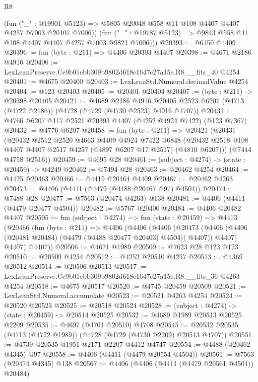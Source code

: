 \begin{lexlean}{R8}
\begin{coremodule}
          (fun ("_" : @19901 @5123) =>
          @5805 @20048 @558 @11 @108 @4407 @4407 @4257 @7003 @20107 @7006))
        (fun ("_" : @19787 @5123) => @9843 @558 @11 @108 @4407 @4407 @4257 @7003 @9821 @7006)))
@20393 := @6150 @4409
@20396 := fun (byte : @211) => @4406 @20393 @4407
@20398 := @4671 @2186 @4916
@20400 := LexLeanPreserve.Ce9b01ebb309b9802d618c1647c27a15e.R8.__fits_40 @4254
@20401 := @4675 @20400
@20403 := LexLeanStd.Numeral.decimalValue @4254
@20404 := @123 @20403
@20405 := @20401 @20404
@20407 := (byte : @211) -> @20398 @20405
@20421 := @4689
    @2186
    @4916
    @20405
    @2523
    @6207
    (@4713 (@4722 @2186))
    (@4728 (@4729 (@4730 @2523) @4916 @4707))
@20431 := @4766 @6207 @117 @2521 @20393 @4407 (@4252 @4924 @7422) (@123 @7367)
@20432 := @4776 @6207
@20458 := fun (byte : @211) =>
  @20421
    (@20431
      (@20432
        @2512
        @2520
        @4663
        @4409
        @4924
        @7422
        @6848
        (@20432 @2518 @108 @4407 @4407 @2517 @4257 (@4897 @6207 @17 @2517) (@4810 @6207)))
      (@7444 @4758 @2516))
@20459 := @4695 @28
@20461 := (subject : @4274) -> (state : @20459) -> @4249
@20462 := @7494 @28
@20463 := @20462 @4254
@20464 := @4425 @20463
@20466 := @4419 @20464 @4409
@20467 := @20462 @4263
@20473 := @4406 (@4411 (@4479 (@4488 @20467 @97) @4504))
@20474 := @7488 @28
@20477 := @7563 (@20474 @4263) @138
@20481 := @4406 (@4411 (@4479 @20477 @4504))
@20482 := @5767 @20400
@20484 := @4406 @20482 @4407
@20505 := fun (subject : @4274) =>
  fun (state : @20459) =>
  @4413
    (@20466
      (fun (byte : @211) =>
      @4406
        (@4406
          (@4406
            (@20473 (@4406 (@4406 (@20481 @20484) (@4479 (@4488 @20477 @20403) @4504)) @4407))
            @4407)
          @4407)
        @4407))
@20506 := @4671 @1989
@20509 := @7623 @28 @123 @123
@20510 := @20509 @4254
@20512 := @4252 @20510 @4257
@20513 := @4369 @20512
@20514 := @20506 @20513
@20517 := LexLeanPreserve.Ce9b01ebb309b9802d618c1647c27a15e.R8.__fits_36 @4263 @4254
@20518 := @4675 @20517
@20520 := @4745 @20459 @20509
@20521 := LexLeanStd.Numeral.accumulate
@20523 := @20521 @4263 @4254
@20524 := @20520 @20523
@20525 := @20518 @20524
@20528 := (subject : @4274) -> (state : @20459) -> @20514 @20525
@20532 := @4689 @1989 @20513 @20525 @2209
@20535 := @4697 (@4701 @20510) @4708
@20545 := @20532 @20535 (@4713 (@4722 @1989)) (@4728 (@4729 (@4730 @2209) @20513 @4707))
@20551 := @4739 @20535 @1951 @2171 @2207 @4412 @4747
@20554 := @4488 (@20462 @4345) @97
@20558 := @4406 (@4411 (@4479 @20554 @4504))
@20561 := @7563 (@20474 @4345) @138
@20567 := @4406 (@4406 (@4411 (@4479 @20561 @4504)) @20484)

\end{coremodule}
\end{lexlean}
